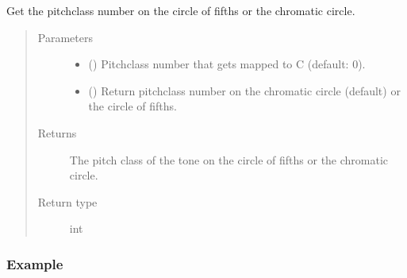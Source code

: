 \documentclass[letterpaper,10pt,english]{sphinxmanual}
\begin{document}
\begin{fulllineitems}
\begin{fulllineitems}
\end{fulllineitems}



\begin{fulllineitems}
\sphinxAtStartPar
Get the pitch\sphinxhyphen{}class number on the circle of fifths or the chromatic circle.
\begin{quote}\begin{description}
\item[{Parameters}] \leavevmode\begin{itemize}
\item {} 
\sphinxAtStartPar
{} () \textendash{} Pitch\sphinxhyphen{}class number that gets mapped to C (default: 0).

\item {} 
\sphinxAtStartPar
{} () \textendash{} Return pitch\sphinxhyphen{}class number on the chromatic circle (default) or the circle of fifths.

\end{itemize}

\item[{Returns}] \leavevmode
\sphinxAtStartPar
The pitch class of the tone on the circle of fifths or the chromatic circle.

\item[{Return type}] \leavevmode
\sphinxAtStartPar
int

\end{description}\end{quote}
\subsubsection*{Example}

\begin{sphinxVerbatim}[commandchars=\\\{\}]
   
\end{sphinxVerbatim}


\end{fulllineitems}
\end{fulllineitems}
\end{document}
